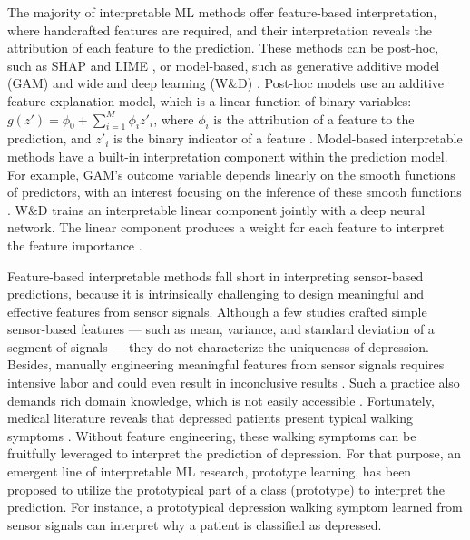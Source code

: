 \documentclass[mnsc]{informs3b} %
\begin{document}
The majority of interpretable ML methods offer feature-based interpretation, where handcrafted features are required, and their interpretation reveals the attribution of each feature to the prediction. These methods can be post-hoc, such as SHAP and LIME \citep{lundberg_unified_2017}, or model-based, such as generative additive model (GAM) \citep{caruana_intelligible_2015} and wide and deep learning (W\&D) \citep{xie_unbox_2020}. Post-hoc models use an additive feature explanation model, which is a linear function of binary variables: $g(z')=\phi_0+\sum_{i=1}^{M} \phi_i z'_i$, where $\phi_i$ is the attribution of a feature to the prediction, and $z'_i$ is the binary indicator of a feature \citep{lundberg_unified_2017}. Model-based interpretable methods have a built-in interpretation component within the prediction model. For example, GAM's outcome variable depends linearly on the smooth functions of predictors, with an interest focusing on the inference of these smooth functions \citep{caruana_intelligible_2015}. W\&D trains an interpretable linear component jointly with a deep neural network. The linear component produces a weight for each feature to interpret the feature importance \citep{cheng_wide_2016}.

Feature-based interpretable methods fall short in interpreting sensor-based predictions, because it is intrinsically challenging to design meaningful and effective features from sensor signals. Although a few studies crafted simple sensor-based features — such as mean, variance, and standard deviation of a segment of signals \citep{oung_wearable_2015} — they do not characterize the uniqueness of depression. Besides, manually engineering meaningful features from sensor signals requires intensive labor and could even result in inconclusive results \citep{hubble_wearable_2015,yu_wearable_2022}. Such a practice also demands rich domain knowledge, which is not easily accessible \citep{yu_wearable_2022}. Fortunately, medical literature reveals that depressed patients present typical walking symptoms \citep{sloman_gait_1982,lemke_spatiotemporal_2000,nhs_symptoms_2022}. Without feature engineering, these walking symptoms can be fruitfully leveraged to interpret the prediction of depression. For that purpose, an emergent line of interpretable ML research, prototype learning, has been proposed to utilize the prototypical part of a class (prototype) to interpret the prediction. For instance, a prototypical depression walking symptom learned from sensor signals can interpret why a patient is classified as depressed.
\end{document}
